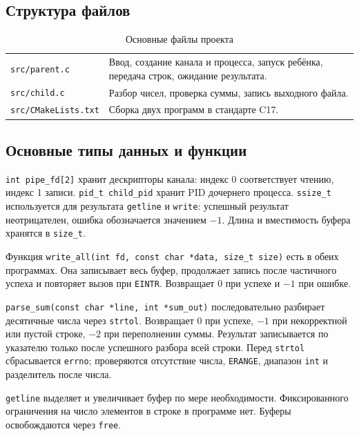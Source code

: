 \documentclass[12pt,a4paper]{article}
\begin{document}
\subsection{Структура файлов}
\begin{table}[H]
\caption{Основные файлы проекта}
\begin{tabularx}{\linewidth}{|P{4.6cm}|L|}
\hline
{} &  \\ \hline
\texttt{src/parent.c} & Ввод, создание канала и процесса, запуск ребёнка, передача строк, ожидание результата. \\ \hline
\texttt{src/child.c} & Разбор чисел, проверка суммы, запись выходного файла. \\ \hline
\texttt{src/CMakeLists.txt} & Сборка двух программ в стандарте C17. \\ \hline
\end{tabularx}
\end{table}


\subsection{Основные типы данных и функции}
\texttt{int pipe\_fd[2]} хранит дескрипторы канала: индекс 0 соответствует чтению, индекс 1 записи. \texttt{pid\_t child\_pid} хранит PID дочернего процесса. \texttt{ssize\_t} используется для результата \texttt{getline} и \texttt{write}: успешный результат неотрицателен, ошибка обозначается значением $-1$. Длина и вместимость буфера хранятся в \texttt{size\_t}.

Функция \texttt{write\_all(int fd, const char *data, size\_t size)} есть в обеих программах. Она записывает весь буфер, продолжает запись после частичного успеха и повторяет вызов при \texttt{EINTR}. Возвращает 0 при успехе и $-1$ при ошибке.

\texttt{parse\_sum(const char *line, int *sum\_out)} последовательно разбирает десятичные числа через \texttt{strtol}. Возвращает 0 при успехе, $-1$ при некорректной или пустой строке, $-2$ при переполнении суммы. Результат записывается по указателю только после успешного разбора всей строки. Перед \texttt{strtol} сбрасывается \texttt{errno}; проверяются отсутствие числа, \texttt{ERANGE}, диапазон \texttt{int} и разделитель после числа.

\texttt{getline} выделяет и увеличивает буфер по мере необходимости. Фиксированного ограничения на число элементов в строке в программе нет. Буферы освобождаются через \texttt{free}.
\end{document}

